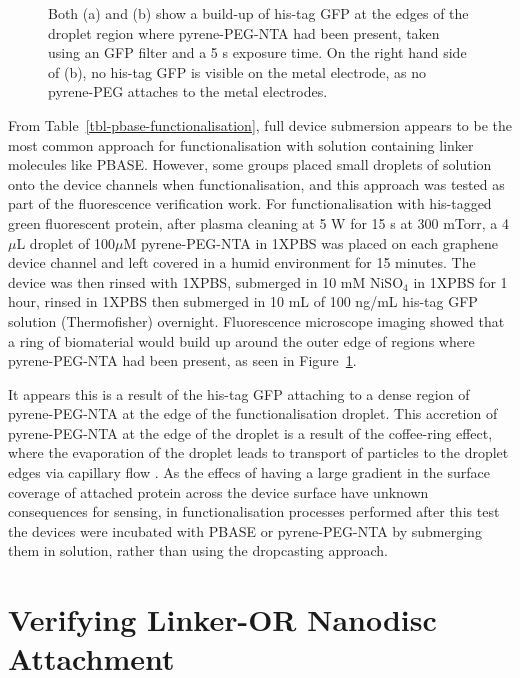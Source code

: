 \documentclass[
  a4paper,
]{scrbook}
\begin{document}
\begin{figure}
\begin{minipage}[t]{0.47\linewidth}
{{}

}

\subcaption{\label{fig-GFP-coffee-ring-2}}
\end{minipage}%

\caption{\label{fig-GFP-coffee-ring}Both (a) and (b) show a build-up of
his-tag GFP at the edges of the droplet region where pyrene-PEG-NTA had
been present, taken using an GFP filter and a 5 s exposure time. On the
right hand side of (b), no his-tag GFP is visible on the metal
electrode, as no pyrene-PEG attaches to the metal electrodes.}

\end{figure}

From Table~\ref{tbl-pbase-functionalisation}, full device submersion
appears to be the most common approach for functionalisation with
solution containing linker molecules like PBASE. However, some groups
placed small droplets of solution onto the device channels when
functionalisation, and this approach was tested as part of the
fluorescence verification work. For functionalisation with his-tagged
green fluorescent protein, after plasma cleaning at 5 W for 15 s at 300
mTorr, a 4 \(\mu\)L droplet of 100\(\mu\)M pyrene-PEG-NTA in 1XPBS was
placed on each graphene device channel and left covered in a humid
environment for 15 minutes. The device was then rinsed with 1XPBS,
submerged in 10 mM NiSO\(_4\) in 1XPBS for 1 hour, rinsed in 1XPBS then
submerged in 10 mL of 100 ng/mL his-tag GFP solution (Thermofisher)
overnight. Fluorescence microscope imaging showed that a ring of
biomaterial would build up around the outer edge of regions where
pyrene-PEG-NTA had been present, as seen in
Figure~\ref{fig-GFP-coffee-ring}.

It appears this is a result of the his-tag GFP attaching to a dense
region of pyrene-PEG-NTA at the edge of the functionalisation droplet.
This accretion of pyrene-PEG-NTA at the edge of the droplet is a result
of the coffee-ring effect, where the evaporation of the droplet leads to
transport of particles to the droplet edges via capillary flow
\autocite{Deegan1997,Shimobayashi2018}. As the effecs of having a large
gradient in the surface coverage of attached protein across the device
surface have unknown consequences for sensing, in functionalisation
processes performed after this test the devices were incubated with
PBASE or pyrene-PEG-NTA by submerging them in solution, rather than
using the dropcasting approach.

\hypertarget{sec-linker-receptor-attachment}{%
\section{Verifying Linker-OR Nanodisc
Attachment}\label{sec-linker-receptor-attachment}}
\end{document}
